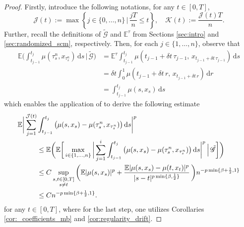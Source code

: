 \documentclass[reqno,  oneside, 12pt]{amsart}
\begin{document}
\begin{proof}
	Firstly, introduce the following notations, for any \( t \in [0, T] \),
	\[
	\mathcal{J}(t) := \max\left\{j \in \{0, \ldots, n\} \,\big|\, \frac{jT}{n} \le t \right\},
	\quad 
	\mathcal{K}(t) := \frac{\mathcal{J}(t)T}{n}.
	\]
	Further, recall the definitions of $\tilde{\mathscr G}$ and $\mathbb E^\tau$ from Sections \ref{sec:intro} and \ref{sec:randomized_scm}, respectively.  Then, for each \( j \in \{1, \ldots, n\} \), observe that
	\begin{align*}
		\mathbb{E}\Big(\int_{t_{j-1}}^{t_j}\mu(\tau^n_s, x_{\tau^n_s})\,\mathrm{d}s \,\big|\, \tilde{\mathscr{G}} \Big)
		&= \mathbb{E}^\tau \int_{t_{j-1}}^{t_j} \mu(t_{j-1} + \delta t  \,
		\tau_{j-1},\, x_{t_{j-1} + \delta t \, \tau_{j-1}})  \,\mathrm{d}s \\
		&= \delta t \int_0^1 \mu(t_{j-1} + \delta t \, r,\, x_{t_{j-1} + \delta t \,r}) \,  \mathrm{d}r \\
		&= \int_{t_{j-1}}^{t_j} \mu(s, x_s)\, \mathrm{d}s
	\end{align*}
	which enables the application of \cite[Theorem 4.1]{Kruse2019} to derive the following estimate 
	\begin{align} \label{eq:term_1}
		\mathbb{E}\bigg|\sum_{j=1}^{\mathcal{J}(t)} & \int_{t_{j-1}}^{t_j} \big(\mu(s, x_s) - \mu(\tau^n_s, x_{\tau^n_s})\big) \,\mathrm{d}s \bigg|^p \notag
		\\ 
		&\leq \mathbb{E}\bigg( \mathbb{E}\bigg[ \max_{i \in \{1,\ldots,n\}} \bigg| \sum_{j=1}^{i} \int_{t_{j-1}}^{t_j} \big(\mu(s, x_s) - \mu(\tau^n_s, x_{\tau^n_s})\big) \,\mathrm{d}s \bigg|^p \,\Big|\, \tilde{\mathscr{G}} \bigg] \bigg) \notag \\
		&\leq C \sup_{\substack{s,t \in [0,T] \\ s \neq t}} \bigg( \mathbb{E}|\mu(s, x_s)|^p + \frac{\mathbb{E}|\mu(s, x_s) - \mu(t, x_t)|^p}{|s - t|^{p \min\{\beta, \frac{1}{2}\}}} \,\bigg) n^{-p \min\{\beta + \frac{1}{2}, 1\}} \notag \\
		&\leq C n^{-p \min\{\beta + \frac{1}{2}, 1\}}.
	\end{align}
	for any \( t \in [0,T] \), where for the last step, one utilizes Corollaries \ref{cor:_coefficients_mb} and \ref{cor:regularity_drift}.
	

\end{proof}
\end{document}

